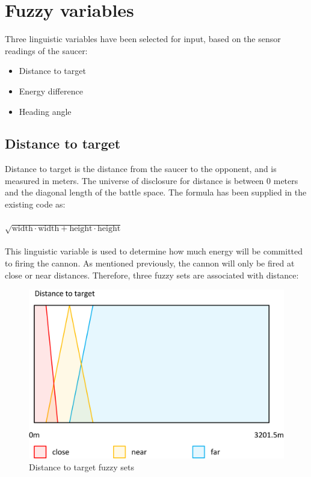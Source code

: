 \newpage

\section{Fuzzy variables}

Three linguistic variables have been selected for input, based on the sensor readings of the saucer:

\begin{itemize}
	\item Distance to target
	\item Energy difference
	\item Heading angle
\end{itemize}

\subsection{Distance to target}

Distance to target is the distance from the saucer to the opponent, and is measured in meters. The universe of disclosure for distance is between 0 meters and the diagonal length of the battle space. The formula has been supplied in the existing code as:
\\
\\
$\sqrt{\mbox{width} \cdot \mbox{width} + \mbox{height} \cdot \mbox{height}}$
\\
\\
This linguistic variable is used to determine how much energy will be committed to firing the cannon. As mentioned previously, the cannon will only be fired at close or near distances. Therefore, three fuzzy sets are associated with distance:

\begin{figure}[H]
\centering
\caption{Distance to target fuzzy sets}
\includegraphics[scale=0.1]{./img/pdf/distanceSets.pdf}
\end{figure}

